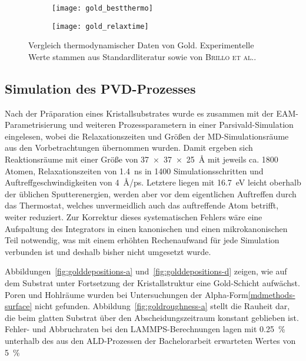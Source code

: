 \begin{figure}
  \captionsetup[subfigure]{singlelinecheck=false}
  \def\subfigwidth{7cm}
  \begin{subfigure}[t]{\subfigwidth}
    \texttt{[image: gold\_bestthermo]}
    \label{fig:goldthermo-a}
  \end{subfigure}
  \hfill
  \begin{subfigure}[t]{\subfigwidth}
    \texttt{[image: gold\_relaxtime]}
    \label{fig:goldthermo-b}
  \end{subfigure}
  \caption[Vergleich thermodynamischer Daten von Gold]{
    Vergleich thermodynamischer Daten von Gold.
    Experimentelle Werte stammen aus Standardliteratur sowie von \textsc{Brillo et al.}\cite{brillo_density_2006}.
  }
  \label{fig:goldthermo}
\end{figure}

\subsection{Simulation des PVD-Prozesses}

Nach der Präparation eines Kristallsubstrates wurde es zusammen mit der EAM-Parametrisierung und weiteren Prozessparametern in einer Parsivald-Simulation eingelesen, wobei die Relaxationszeiten und Größen der MD-Simulationsräume aus den Vorbetrachtungen übernommen wurden.
Damit ergeben sich Reaktionsräume mit einer Größe von \SI{37x37x25}{\angstrom} mit jeweils ca. \num{1800} Atomen, Relaxationszeiten von \SI{1.4}{\nano\second} in \num{1400} Simulationsschritten und Auftreffgeschwindigkeiten von \SI{4}{\angstrom/\pico\second}.
Letztere liegen mit \SI{16.7}{\electronvolt} leicht oberhalb der üblichen Sputterenergien, werden aber vor dem eigentlichen Auftreffen durch das Thermostat, welches unvermeidlich auch das auftreffende Atom betrifft, weiter reduziert.
Zur Korrektur dieses systematischen Fehlers wäre eine Aufspaltung des Integrators in einen kanonischen und einen mikrokanonischen Teil notwendig, was mit einem erhöhten Rechenaufwand für jede Simulation verbunden ist und deshalb bisher nicht umgesetzt wurde.

Abbildungen~\ref{fig:golddepositions-a} und~\ref{fig:golddepositions-d} zeigen, wie auf dem Substrat unter Fortsetzung der Kristallstruktur eine Gold-Schicht aufwächst.
Poren und Hohlräume wurden bei Untersuchungen der Alpha-Form\ref{mdmethods-surface} nicht gefunden.
Abbildung~\ref{fig:goldroughness-a} stellt die Rauheit dar, die beim glatten Substrat über den Abscheidungszeitraum konstant geblieben ist.
Fehler- und Abbruchraten bei den LAMMPS-Berechnungen lagen mit \SI{0.25}{\percent} unterhalb des aus den ALD-Prozessen der Bachelorarbeit erwarteten Wertes von \SI{5}{\percent}

